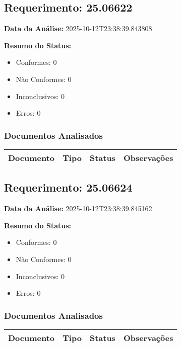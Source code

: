 \documentclass[12pt,a4paper]{article}
\begin{document}
\subsection{Requerimento: 25.06622}

\textbf{Data da Análise:} 2025-10-12T23:38:39.843808

\textbf{Resumo do Status:}
\begin{itemize}
    \item Conformes: 0
    \item Não Conformes: 0
    \item Inconclusivos: 0
    \item Erros: 0
\end{itemize}

\subsubsection{Documentos Analisados}

\begin{longtable}{|p{4cm}|p{2cm}|p{2cm}|p{6cm}|}
\hline
\textbf{Documento} & \textbf{Tipo} & \textbf{Status} & \textbf{Observações} \\
\hline
\endhead
\end{longtable}


\subsection{Requerimento: 25.06624}

\textbf{Data da Análise:} 2025-10-12T23:38:39.845162

\textbf{Resumo do Status:}
\begin{itemize}
    \item Conformes: 0
    \item Não Conformes: 0
    \item Inconclusivos: 0
    \item Erros: 0
\end{itemize}

\subsubsection{Documentos Analisados}

\begin{longtable}{|p{4cm}|p{2cm}|p{2cm}|p{6cm}|}
\hline
\textbf{Documento} & \textbf{Tipo} & \textbf{Status} & \textbf{Observações} \\
\hline
\endhead
\end{longtable}
\end{document}
